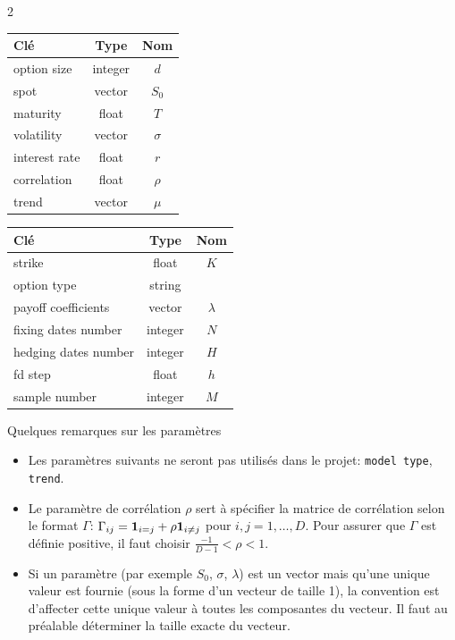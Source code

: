 \documentclass[a4paper,11pt]{article}
\def\ind#1{{\bf 1}_{#1}}
\begin{document}
\begin{multicols}{2}
\begin{center}
  \begin{tabular}{l@{$\quad$}|@{$\quad$}c|@{$\quad$}c}
    Clé & Type & Nom\\
    \hline
    option size & integer & $d$ \\
    spot & vector & $S_0$\\
    maturity & float & $T$\\
    volatility & vector & $\sigma$\\
    interest rate & float & $r$ \\
    correlation & float & $\rho$\\
    trend & vector & $\mu$ \\
  \end{tabular}

  \begin{tabular}{l@{$\quad$}|@{$\quad$}c|@{$\quad$}c}
    Clé & Type & Nom\\
    \hline
    strike & float & $K$\\
    option type & string & \\
    payoff coefficients & vector &$\lambda$ \\
    fixing dates number & integer &$N$ \\
    hedging dates number & integer &$H$ \\
    fd step & float &$h$ \\
    sample number & integer  & $M$
  \end{tabular}
\end{center}
\end{multicols}
Quelques remarques sur les paramètres
\begin{itemize}
  \item Les paramètres suivants ne seront pas utilisés dans le projet: \verb!model type!, \verb!trend!.
  \item Le paramètre de corrélation $\rho$ sert à spécifier la matrice de corrélation selon le format $\Gamma$: $\Gamma_{ij} = \ind{i = j} + \rho \ind{i \neq j}$ pour $i,j=1,\dots,D$. Pour assurer que $\Gamma$ est définie positive, il faut choisir $\frac{-1}{D-1} < \rho < 1$.
  \item Si un paramètre (par exemple $S_0$, $\sigma$, $\lambda$) est un vector mais qu'une unique valeur est fournie (sous la forme d'un vecteur de taille 1), la convention est d'affecter cette unique valeur à toutes les composantes du vecteur. Il faut au préalable déterminer la taille exacte du vecteur.
\end{itemize}
\end{document}

